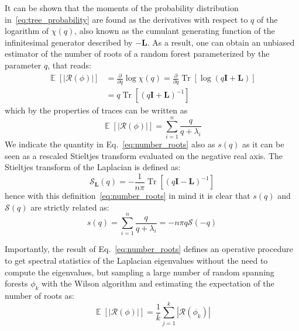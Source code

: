\documentclass[10pt,aps,pre,twocolumn,nofootinbib,superscriptaddress,longbibliography]{revtex4-1}
\newcommand{\bE}[1]{\operatorname{\mathbb{E}}\left\lbrack #1\right\rbrack}
\newcommand{\bI}{\mathbf{I}}
\newcommand{\bL}{\mathbf{L}}
\newcommand{\Tr}[1]{\operatorname{Tr}\left\lbrack #1\right\rbrack}
\begin{document}
It can be shown that the moments of the probability distribution in~\ref{eq:tree_probability} are found as the derivatives with respect to $q$ of the logarithm of $\chi(q)$, also known as the cumulant generating function of the infinitesimal generator described by $-\bL$.
As a result, one can obtain an unbiased estimator of the number of roots of a random forest parameterized by the parameter $q$, that reads:
\begin{align}
\bE{|\mathcal{R}(\phi)|} &= \frac{\partial }{\partial q}\log \chi(q) = \frac{\partial}{\partial q} \Tr{\log(q\bI + \bL)}\nonumber \\ &= q\Tr{(q\bI + \bL)^{-1}}
\end{align}
which by the properties of traces can be written as
\begin{equation}\label{eq:number_roots}
\bE{|\mathcal{R}(\phi)|} = \sum_{i=1}^n \frac{q}{q+\lambda_i}
\end{equation}
We indicate the quantity in Eq.~\ref{eq:number_roots} also as $s(q)$ as it can be seen as a rescaled Stieltjes transform evaluated on the negative real axis\cite{nadakuditi2013}.
The Stieltjes transform of the Laplacian is defined as: 
\begin{equation}
    \mathcal{S}_{\bL}(q) = -\frac{1}{n \pi} \Tr{(q\bI - \bL)^{-1}}
\end{equation}
hence with this definition~\ref{eq:number_roots} in mind it is clear that $s(q)$ and $\mathcal{S}(q)$ are strictly related as:
\begin{equation}
    s(q) = \sum_{i=1}^n \frac{q}{q+\lambda_i} = -n\pi q \mathcal{S}(-q)
\end{equation}

Importantly, the result of Eq.~\ref{eq:number_roots} defines an operative procedure to get spectral statistics of the Laplacian eigenvalues without the need to compute the eigenvalues, but sampling a large number of random spanning forests $\phi_k$ with the Wilson algorithm and estimating the expectation of the number of roots as:
\begin{equation}
\bE{|\mathcal{R}(\phi)|} = \frac{1}{k}\sum_{j=1}^k |\mathcal{R}(\phi_k)|
\end{equation}
\end{document}
